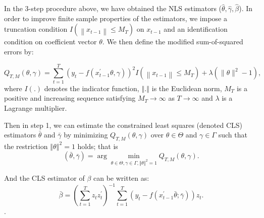 \documentclass[a4paper,12pt,times,numbered,print,index]{report}
\numberwithin{equation}{section}
\begin{document}
In the 3-step procedure above, we have obtained the NLS estimators ($\widehat{\theta}, \widehat{\gamma}, \widehat{\beta}$). In order to improve finite sample properties of the estimators, we impose a truncation condition $I\left(\left\|x_{t-1}\right\| \leq M_T\right)$ on $x_{t-1}$ and an identification condition on coefficient vector $\theta$. We then define the modified sum-of-squared errors by:

$$
Q_{T, M}(\theta, \gamma)=\sum_{t=1}^{T}\left(y_{t}-f\left(x_{t-1}^{\prime} \theta, \gamma\right)\right)^{2} I\left(\left\|x_{t-1}\right\| \leq M_{T}\right)+\lambda\left(\|\theta\|^{2}-1\right),
$$
where $I\left( .\right) $ denotes the indicator function, $%
\left\Vert .\right\Vert $ is the Euclidean norm, $M_T$ is a positive and increasing sequence satisfying $ M_{T}\rightarrow \infty $ as $T \rightarrow \infty $ and $\lambda $ is a Lagrange
multiplier. 

Then in step 1, we can estimate the constrained least squares (denoted CLS) estimators $\bar{\theta}$ and $%
\bar{\gamma}$ by minimizing $Q_{T,M}\left( \theta ,\gamma \right) 
$ over $\theta \in \Theta $ and $\gamma \in \Gamma $ such that the
restriction $\left\Vert \theta \right\Vert ^{2}=1$ holds; that is%
\begin{equation*}
\left( \bar{\theta},\bar{\gamma}\right) =\arg \min_{\theta \in \Theta
	,\gamma \in \Gamma ,\left\Vert \theta \right\Vert ^{2}=1}Q_{T,M}\left(
\theta ,\gamma \right) .  \label{cls_c3}
\end{equation*}%

And the CLS estimator of $\beta$ can be written as:
$$
\bar{\beta} = \left( \sum_{t=1}^{T}z_t z_t^{\prime}\right)^{-1}\sum_{t=1}^{T}\left( y_t- f\left( x_{t-1}^{\prime }\bar{\theta}; \bar{\gamma}\right)\right) z_t.
$$.
\end{document}
